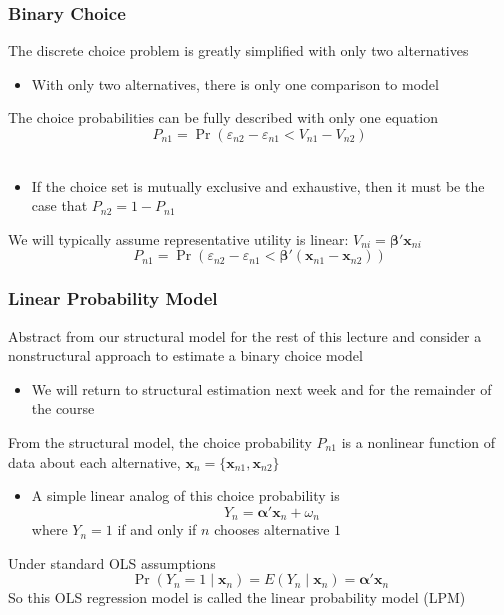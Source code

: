 \documentclass{beamer}
\begin{document}
\begin{frame}\frametitle{Binary Choice}
    The discrete choice problem is greatly simplified with only two alternatives
    \begin{itemize}
        \item With only two alternatives, there is only one comparison to model
    \end{itemize}
    \vspace{3ex}
    The choice probabilities can be fully described with only one equation 
    $$P_{n1} = \Pr(\varepsilon_{n2} - \varepsilon_{n1} < V_{n1} - V_{n2})$$ \\
    \begin{itemize}
        \item If the choice set is mutually exclusive and exhaustive, then it must be the case that $P_{n2} = 1 - P_{n1}$
    \end{itemize}
    \vspace{3ex}
    We will typically assume representative utility is linear: $V_{ni} = \bm{\beta}' \bm{x}_{ni}$
    $$P_{n1} = \Pr(\varepsilon_{n2} - \varepsilon_{n1} < \bm{\beta}' (\bm{x}_{n1} - \bm{x}_{n2}))$$
\end{frame}

\begin{frame}\frametitle{Linear Probability Model}
    Abstract from our structural model for the rest of this lecture and consider a nonstructural approach to estimate a binary choice model
    \begin{itemize}
        \item We will return to structural estimation next week and for the remainder of the course
    \end{itemize}
    \vspace{2ex}
    From the structural model, the choice probability $P_{n1}$ is a nonlinear function of data about each alternative, $\bm{x}_n = \{\bm{x}_{n1}, \bm{x}_{n2}\}$
    \begin{itemize}
        \item A simple linear analog of this choice probability is
    $$Y_n = \bm{\alpha}' \bm{x}_n + \omega_n$$
    where $Y_n = 1$ if and only if $n$ chooses alternative $1$
    \end{itemize}
    \vspace{2ex}
    Under standard OLS assumptions
    $$\Pr(Y_n = 1 \mid \bm{x}_n) = E(Y_n \mid \bm{x}_n) = \bm{\alpha}' \bm{x}_n$$
    So this OLS regression model is called the linear probability model (LPM)
\end{frame}
\end{document}
